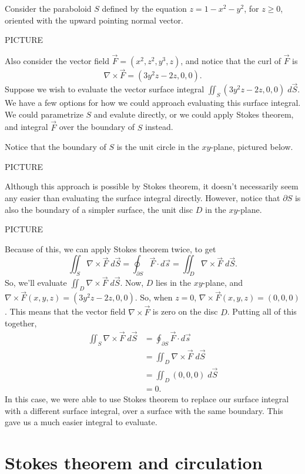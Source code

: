 \documentclass{ximera}
\begin{document}
\begin{example}
Consider the paraboloid $S$ defined by the equation $z = 1-x^2-y^2$, for $z\geq 0$, oriented with the upward pointing normal vector.

PICTURE

Also consider the vector field $\vec{F} = (x^2, z^2, y^3, z)$, and notice that the curl of $\vec{F}$ is
\[
\nabla\times \vec{F} = (3y^2z-2z, 0, 0).
\]
Suppose we wish to evaluate the vector surface integral $\iint_S (3y^2z-2z, 0, 0)\;d\vec{S}$. We have a few options for how we could approach evaluating this surface integral. We could parametrize $S$ and evalute directly, or we could apply Stokes theorem, and integral $\vec{F}$ over the boundary of $S$ instead.

Notice that the boundary of $S$ is the unit circle in the $xy$-plane, pictured below.

PICTURE

Although this approach is possible by Stokes theorem, it doesn't necessarily seem any easier than evaluating the surface integral directly. However, notice that $\partial S$ is also the boundary of a simpler surface, the unit disc $D$ in the $xy$-plane.

PICTURE

Because of this, we can apply Stokes theorem twice, to get
\[
\iint_S \nabla\times \vec{F}\;d\vec{S} = \oint_{\partial S} \vec{F}\cdot d\vec{s} = \iint_D \nabla\times \vec{F}\;d\vec{S}.
\]
So, we'll evaluate $\iint_D \nabla\times \vec{F}\;d\vec{S}$. Now, $D$ lies in the $xy$-plane, and $\nabla\times \vec{F}(x,y,z) = (3y^2z-2z, 0, 0)$. So, when $z=0$, $\nabla\times \vec{F}(x,y,z) = (0,0,0)$. This means that the vector field $\nabla\times \vec{F}$ is zero on the disc $D$. Putting all of this together,
\begin{align*}
\iint_S \nabla\times \vec{F}\;d\vec{S} &= \oint_{\partial S} \vec{F}\cdot d\vec{s}\\
 &= \iint_D \nabla\times \vec{F}\;d\vec{S}\\
 &= \iint_D (0,0,0)\;d\vec{S}\\
 &= 0.
\end{align*}
In this case, we were able to use Stokes theorem to replace our surface integral with a different surface integral, over a surface with the same boundary. This gave us a much easier integral to evaluate.
\end{example}

\section*{Stokes theorem and circulation}
\end{document}

